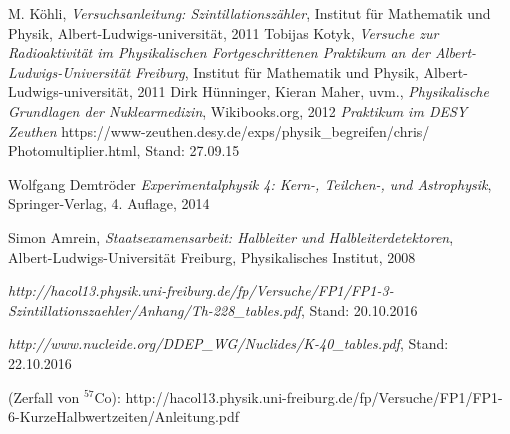 \documentclass[12pt,listof=totoc]{scrartcl}
\begin{document}
\thispagestyle{empty}
\begin{thebibliography}{9}

	M. Köhli,
	\emph{Versuchsanleitung: Szintillationszähler},
	Institut für Mathematik und Physik,
	Albert-Ludwigs-universität,
	2011
	Tobijas Kotyk,
	\emph{Versuche zur Radioaktivität im Physikalischen Fortgeschrittenen Praktikum an der Albert-Ludwigs-Universität Freiburg},
	Institut für Mathematik und Physik,
	Albert-Ludwigs-universität,
	2011
	Dirk Hünninger, Kieran Maher, uvm.,
	\emph{Physikalische Grundlagen der Nuklearmedizin},
	Wikibooks.org,
	2012
	\emph{Praktikum im DESY Zeuthen}
	https://www-zeuthen.desy.de/exps/physik\_begreifen/chris/\\Photomultiplier.html,
	Stand: 27.09.15
	
Wolfgang Demtröder
 \emph{Experimentalphysik 4: Kern-, Teilchen-, und Astrophysik},
 Springer-Verlag,
 4. Auflage,
 2014
 
 Simon Amrein,
 \emph{Staatsexamensarbeit: Halbleiter und Halbleiterdetektoren},\\
 Albert-Ludwigs-Universität Freiburg,
 Physikalisches Institut,
 2008
 
\emph{http://hacol13.physik.uni-freiburg.de/fp/Versuche/FP1/FP1-3-Szintillationszaehler/Anhang/Th-228\_tables.pdf}, Stand: 20.10.2016

\emph{http://www.nucleide.org/DDEP\_WG/Nuclides/K-40\_tables.pdf}, Stand: 22.10.2016

(Zerfall von $^{57}$Co): http://hacol13.physik.uni-freiburg.de/fp/Versuche/FP1/FP1-6-KurzeHalbwertzeiten/Anleitung.pdf
\end{thebibliography}
\end{document}
